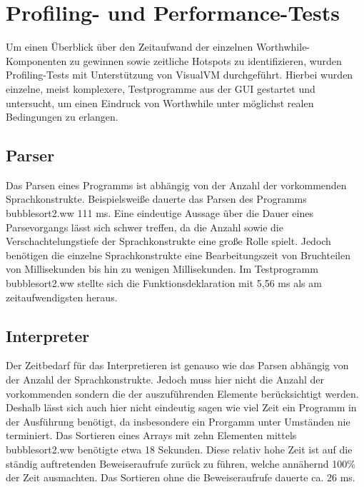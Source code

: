 \section{Profiling- und Performance-Tests}
Um einen Überblick über den Zeitaufwand der einzelnen Worthwhile-Komponenten zu gewinnen sowie zeitliche Hotspots zu identifizieren, wurden Profiling-Tests mit Unterstützung von VisualVM durchgeführt. Hierbei wurden einzelne, meist komplexere, Testprogramme aus der GUI gestartet und untersucht, um einen Eindruck von Worthwhile unter möglichst realen Bedingungen zu erlangen.

\subsection{Parser}
Das Parsen eines Programms ist abhängig von der Anzahl der vorkommenden Sprachkonstrukte. Beispielsweiße dauerte das Parsen des Programms bubblesort2.ww 111 ms. Eine eindeutige Aussage über die Dauer eines Parsevorgangs lässt sich schwer treffen, da die Anzahl sowie die Verschachtelungstiefe der Sprachkonstrukte eine große Rolle spielt. Jedoch benötigen die einzelne Sprachkonstrukte eine Bearbeitungszeit von Bruchteilen von Millisekunden bis hin zu wenigen Millisekunden. Im Testprogramm bubblesort2.ww stellte sich die Funktionsdeklaration mit 5,56 ms als am zeitaufwendigsten heraus.

\subsection{Interpreter}
Der Zeitbedarf für das Interpretieren ist genauso wie das Parsen abhängig von der Anzahl der Sprachkonstrukte. Jedoch muss hier nicht die Anzahl der vorkommenden sondern die der auszuführenden Elemente berücksichtigt werden. Deshalb lässt sich auch hier nicht eindeutig sagen wie viel Zeit ein Programm in der Ausführung benötigt, da insbesondere ein Prorgamm unter Umständen nie terminiert. Das Sortieren eines Arrays mit zehn Elementen mittels bubblesort2.ww benötigte etwa 18 Sekunden. Diese relativ hohe Zeit ist auf die ständig auftretenden Beweiseraufrufe zurück zu führen, welche annähernd 100\% der Zeit ausmachten. Das Sortieren ohne die Beweiseraufrufe dauerte ca. 26 ms.

